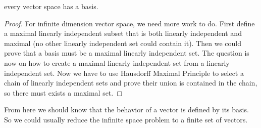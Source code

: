\begin{theorem}
    every vector space has a basis.
\end{theorem}
\begin{proof}
    For infinite dimension vector space, we need more work to do. First define a maximal linearly independent subset that is both linearly independent and maximal (no other linearly independent set could contain it). Then we could prove that a basis must be a maximal linearly independent set. The question is now on how to create a maximal linearly independent set from a linearly independent set. Now we have to use Hausdorff Maximal Principle to select a chain of linearly independent sets and prove their union is contained in the chain, so there must exists a maximal set.
\end{proof}


From here we should know that the behavior of a vector is defined by its basis. So we could usually reduce the infinite space problem to a finite set of vectors.

















